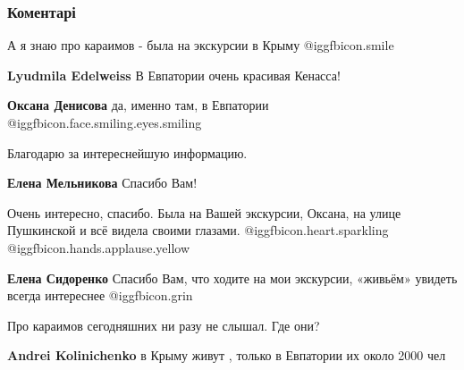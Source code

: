  
 
 
 
 
\subsubsection{Коментарі}
\label{sec:08_11_2021.fb.fb_group.story_kiev_ua.1.kiev_19_vek_karaim_kupec_kogen.cmt}

\begin{itemize} %
А я знаю про караимов - была на экскурсии в Крыму  @igg{fbicon.smile} 

\begin{itemize} %
\textbf{Lyudmila Edelweiss} В Евпатории очень красивая Кенасса!

\textbf{Оксана Денисова} да, именно там, в Евпатории  @igg{fbicon.face.smiling.eyes.smiling} 
\end{itemize} %

Благодарю за интереснейшую информацию.

\begin{itemize} %
\textbf{Елена Мельникова} Спасибо Вам!
\end{itemize} %


Очень интересно, спасибо. Была на Вашей экскурсии, Оксана, на улице Пушкинской и
всё видела своими глазами. @igg{fbicon.heart.sparkling}  @igg{fbicon.hands.applause.yellow} 

\begin{itemize} %
\textbf{Елена Сидоренко} Спасибо Вам, что ходите на мои экскурсии, «живьём» увидеть всегда интереснее @igg{fbicon.grin} 
\end{itemize} %

Про караимов сегодняшних ни разу не слышал. Где они?

\begin{itemize} %
\textbf{Andrei Kolinichenko} в Крыму живут , только в Евпатории их около 2000 чел


\end{itemize}
\end{itemize}
